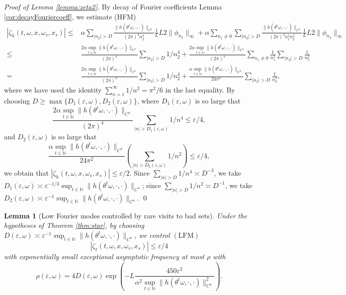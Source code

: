 \documentclass[a4paper]{article}
\theoremstyle{plain}
\newtheorem{lemma}[theorem]{Lemma}
\theoremstyle{definition}
\newcommand{\N}{\mathbb{N}}
\begin{document}
\textit{Proof of Lemma \ref{lemma:zeta2}.} By decay of Fourier coefficients Lemma \ref{cor:decayFouriercoeff}, we estimate (HFM)
\begin{align*}
	\left|\zeta_h(t,\omega,x,\omega_{{s}}, x_{{s}})\right|  \leq& \alpha \sum_{|n_2|>D} \frac{\|h(\theta^t\omega,\cdot,\cdot)\|_{C^4}}{ (2\pi)^4 n_2^4}  \frac{1}{L} L2\|\phi_{n_2}\|_{\infty} + \alpha \sum_{n_1\neq0}\sum_{|n_2|>D} \frac{\|h(\theta^t\omega,\cdot,\cdot)\|_{C^4}}{(2\pi)^4 n_1^2 n_2^2} \frac{1}{L} L 2 \|\phi_{n_2}\|_{\infty} \\
	\leq& \frac{2\alpha \sup_{t\in\N }\|h(\theta^t\omega,\cdot,\cdot)\|_{C^4}}{ (2\pi)^4}\sum_{|n_2|>D} 1/n_2^4 + \frac{2\alpha \sup_{t\in\N } \|h(\theta^t\omega,\cdot,\cdot)\|_{C^4}}{(2\pi)^4} \sum_{n_1\neq 0}\frac{1}{n_1^2} \sum_{|n_2|>D}\frac{1}{n_2^2} \\
	=& \frac{2\alpha \sup_{t\in\N }\|h(\theta^t\omega,\cdot,\cdot)\|_{C^4}}{ (2\pi)^4}\sum_{|n_2|>D} 1/n_2^4 + \frac{\alpha \sup_{t\in\N } \|h(\theta^t\omega,\cdot,\cdot)\|_{C^4}}{24\pi^2}  \sum_{|n_2|>D}\frac{1}{n_2^2},
\end{align*}
where we have used the identity $\sum_{n=1}^{\infty}1/n^2=\pi^2/6$ in the last equality. By choosing $D\geq \max\{D_1(\varepsilon,\omega),D_2(\varepsilon,\omega)\}$, where $D_1(\varepsilon,\omega)$ is so large that 
$$\frac{2\alpha \sup_{t\in\N }\|h(\theta^t\omega,\cdot,\cdot)\|_{C^4}} { (2\pi)^4} \sum_{|n|>D_1(\varepsilon,\omega)}1/n^4\leq \varepsilon/4,$$
and 
$D_2(\varepsilon,\omega)$ is so large that $$\frac{\alpha \sup_{t\in\N }\|h(\theta^t\omega,\cdot,\cdot)\|_{C^4}} { 24\pi^2}\left(\sum_{|n|>D_2(\varepsilon,\omega)}1/n^2\right)\leq \varepsilon/4,$$ 
we obtain that $\left|\zeta_h(t,\omega,x,\omega_{{s}}, x_{{s}})\right| \leq \varepsilon/2.$ 
Since $\sum_{|n|>D} 1/n^4 \asymp D^{-3}$, we take $D_1(\varepsilon,\omega)\asymp \varepsilon^{-1/3}\sup_{t\in\N }\|h(\theta^t\omega,\cdot,\cdot)\|_{C^4}$; since $\sum_{|n|>D} 1/n^2 \asymp D^{-1}$, we take $D_2(\varepsilon,\omega)\asymp \varepsilon^{-1}\sup_{t\in\N }\|h(\theta^t\omega,\cdot,\cdot)\|_{C^4}$. \qed


\begin{lemma}[Low Fourier modes controlled by rare visits to bad sets]\label{lemma:zeta3}
	Under the hypotheses of Theorem \ref{thm:star}, by choosing $D(\varepsilon,\omega) \asymp \varepsilon^{-1} \sup_{t\in\N }\|h(\theta^t\omega,\cdot,\cdot)\|_{C^4}$, we control $\mathrm{(LFM)}$ 
	\[
	\left|\zeta_{\ell} (t,\omega,x,\omega_{{s}}, x_{{s}}) \right|\leq \varepsilon/4
	\]
	with exponentially small exceptional asymptotic frequency at most $\rho$ with 
	$$\rho(\varepsilon,\omega)= 4D (\varepsilon,\omega) \exp\left(-L \frac{450\varepsilon^2}{\alpha^2\sup_{t\in\N }\|h(\theta^t\omega,\cdot,\cdot)\|^2_{C^4}}\right).$$
\end{lemma}
\end{document}

